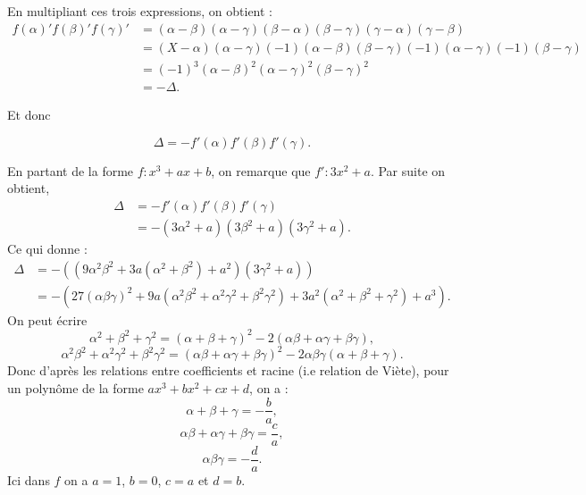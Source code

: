 \begin{demonstration}[Lemme]
En multipliant ces trois expressions, on obtient :
\begin{align*}
    f(\alpha)' f(\beta )' f(\gamma)' &= ( \alpha - \beta ) ( \alpha - \gamma ) ( \beta - \alpha ) ( \beta - \gamma) ( \gamma - \alpha ) ( \gamma - \beta ) \\
&= \left( X - \alpha \right) \left( \alpha - \gamma \right) \left( -1 \right) \left( \alpha - \beta  \right) \left( \beta - \gamma \right) \left( -1 \right) \left( \alpha - \gamma \right) \left( -1 \right) \left( \beta - \gamma \right) \\
&= \left( -1 \right) ^3 \left( \alpha - \beta  \right) ^2 \left( \alpha - \gamma  \right) ^2 \left( \beta - \gamma \right) ^2\\
 &= - \Delta
.\end{align*}

Et donc 

\[
\Delta = - f'(\alpha) f'(\beta ) f'(\gamma)
.\] 

En partant de la forme $f : x^3 + ax + b$, on remarque que $f' : 3x^2 + a$. Par suite on obtient,
\begin{align*}
    \Delta &= - f'(\alpha) f'(\beta ) f'(\gamma) \\
      &= - \left( 3 \alpha^2 + a \right) \left( 3 \beta^2 + a \right) \left( 3 \gamma^2 + a \right) 
.\end{align*}
Ce qui donne :
\begin{align*}
    \Delta  &= - \left( ( 9 \alpha^2 \beta^2 + 3a ( \alpha^2 + \beta^2 ) + a^2 ) ( 3 \gamma^2 + a ) \right)  \\
       &= - \left( 27 \left( \alpha \beta \gamma \right)^2  + 9a \left( \alpha^2 \beta^2 + \alpha^2 \gamma^2 + \beta^2 \gamma^2 \right) + 3a^2 \left( \alpha^2 + \beta^2 + \gamma^2 \right) + a^3 \right) 
.\end{align*}
On peut écrire
\[
\alpha^2 + \beta^2 + \gamma^2 = \left( \alpha + \beta + \gamma \right)^2 - 2 \left( \alpha \beta + \alpha \gamma + \beta \gamma \right)
,\] 
\[
\alpha^2 \beta^2 + \alpha^2 \gamma^2 + \beta^2 \gamma^2 = \left( \alpha \beta + \alpha \gamma + \beta \gamma \right)^2 - 2\alpha \beta \gamma \left( \alpha + \beta + \gamma \right)
.\] 
Donc d'après les relations entre coefficients et racine (i.e relation de Viète), pour un polynôme de la forme $ax^3 + bx^2 + cx + d$, on a :
\[
\alpha + \beta + \gamma = - \frac{b}{a}
,\] 
\[
\alpha \beta + \alpha \gamma + \beta \gamma = \frac{c}{a}
,\] 
\[
\alpha \beta \gamma = - \frac{d}{a}
.\] 
Ici dans $f$ on a $a = 1$, $b = 0$, $c = a$ et $d = b$.


\end{demonstration}
